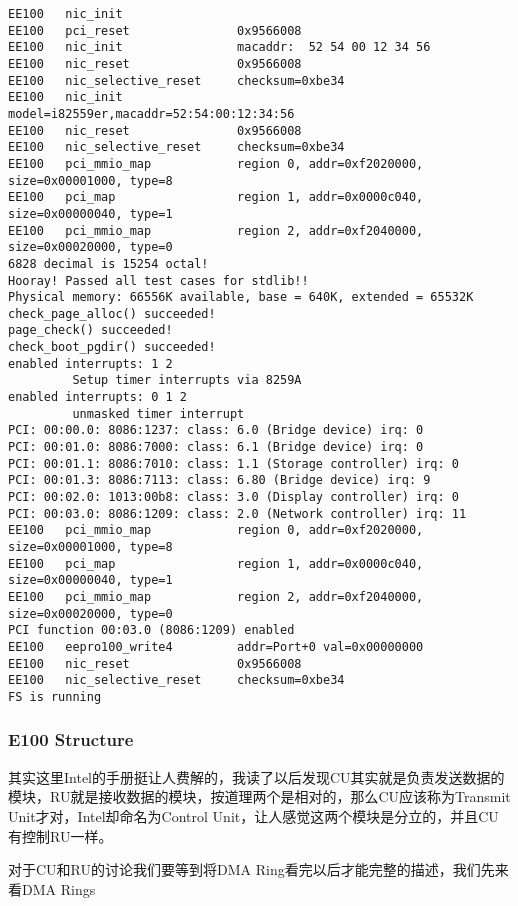 \documentclass{article}
\begin{document}
\begin{CJK*}{UTF8}{gkai}
\begin{lstlisting}[style=console]
EE100	nic_init                
EE100	pci_reset               0x9566008
EE100	nic_init                macaddr:  52 54 00 12 34 56
EE100	nic_reset               0x9566008
EE100	nic_selective_reset     checksum=0xbe34
EE100	nic_init                model=i82559er,macaddr=52:54:00:12:34:56
EE100	nic_reset               0x9566008
EE100	nic_selective_reset     checksum=0xbe34
EE100	pci_mmio_map            region 0, addr=0xf2020000, size=0x00001000, type=8
EE100	pci_map                 region 1, addr=0x0000c040, size=0x00000040, type=1
EE100	pci_mmio_map            region 2, addr=0xf2040000, size=0x00020000, type=0
6828 decimal is 15254 octal!
Hooray! Passed all test cases for stdlib!!
Physical memory: 66556K available, base = 640K, extended = 65532K
check_page_alloc() succeeded!
page_check() succeeded!
check_boot_pgdir() succeeded!
enabled interrupts: 1 2
	     Setup timer interrupts via 8259A
enabled interrupts: 0 1 2
	     unmasked timer interrupt
PCI: 00:00.0: 8086:1237: class: 6.0 (Bridge device) irq: 0
PCI: 00:01.0: 8086:7000: class: 6.1 (Bridge device) irq: 0
PCI: 00:01.1: 8086:7010: class: 1.1 (Storage controller) irq: 0
PCI: 00:01.3: 8086:7113: class: 6.80 (Bridge device) irq: 9
PCI: 00:02.0: 1013:00b8: class: 3.0 (Display controller) irq: 0
PCI: 00:03.0: 8086:1209: class: 2.0 (Network controller) irq: 11
EE100	pci_mmio_map            region 0, addr=0xf2020000, size=0x00001000, type=8
EE100	pci_map                 region 1, addr=0x0000c040, size=0x00000040, type=1
EE100	pci_mmio_map            region 2, addr=0xf2040000, size=0x00020000, type=0
PCI function 00:03.0 (8086:1209) enabled
EE100	eepro100_write4         addr=Port+0 val=0x00000000
EE100	nic_reset               0x9566008
EE100	nic_selective_reset     checksum=0xbe34
FS is running
\end{lstlisting}




\subsubsection{E100 Structure}

其实这里Intel的手册挺让人费解的，我读了以后发现CU其实就是负责发送数据的模块，RU就是接收数据的模块，按道理两个是相对的，那么CU应该称为Transmit Unit才对，Intel却命名为Control Unit，让人感觉这两个模块是分立的，并且CU有控制RU一样。

对于CU和RU的讨论我们要等到将DMA Ring看完以后才能完整的描述，我们先来看DMA Rings


\end{CJK*}
\end{document}
